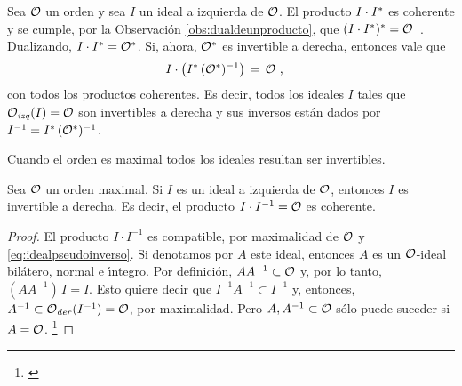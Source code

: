 \begin{obsDiferenteInvertible}\label{obs:diferenteinvertible}
	Sea $\cal{O}$ un orden y sea $I$ un ideal a izquierda de $\cal{O}$.
	El producto $I\cdot \dual{I}$ es coherente y se cumple, por la
	Observaci\'{o}n \ref{obs:dualdeunproducto}, que
	\begin{math}
		\dual{(I\cdot\dual{I})} =\cal{O}
	\end{math}~.
	Dualizando, $I\cdot\dual{I}=\dual{\cal{O}}$. Si, ahora,
	$\dual{\cal{O}}$ es invertible a derecha, entonces vale que
	\begin{align*}
		I\cdot\big(\dual{I}\,(\dual{\cal{O}})^{-1}\big) & \,=\,\cal{O}
		\text{ ,}
	\end{align*}
	con todos los productos coherentes. Es decir, todos los ideales $I$
	tales que $\Oizq(I)=\cal{O}$ son invertibles a derecha y sus inversos
	est\'{a}n dados por $I^{-1}=\dual{I}\,(\dual{\cal{O}})^{-1}$.
\end{obsDiferenteInvertible}

Cuando el orden es maximal todos los ideales resultan ser invertibles.

\begin{propoOrdenMaximalIdealInvertible}%
	\label{propo:ordenmaximalidealinvertible}
	Sea $\cal{O}$ un orden maximal. Si $I$ es un ideal a izquierda de
	$\cal{O}$, entonces $I$ es invertible a derecha. Es decir, el producto
	$I\cdot I^{-1}=\cal{O}$ es coherente.
\end{propoOrdenMaximalIdealInvertible}

\begin{proof}
	El producto $I\cdot I^{-1}$ es compatible, por maximalidad de $\cal{O}$
	y \ref{eq:idealpseudoinverso}. Si denotamos por $A$ este ideal,
	entonces $A$ es un $\cal{O}$-ideal bil\'{a}tero, normal e \'{\i}ntegro.
	Por definici\'{o}n, $AA^{-1}\subset\cal{O}$ y, por lo tanto,
	$(AA^{-1})\,I=I$. Esto quiere decir que $I^{-1}A^{-1}\subset I^{-1}$ y,
	entonces, $A^{-1}\subset\Oder(I^{-1})=\cal{O}$, por maximalidad. Pero
	$A,A^{-1}\subset\cal{O}$ s\'{o}lo puede suceder si $A=\cal{O}$.%
	\footnote{
		\cite[Satz~6, \S~2]{Deuring}
	}
\end{proof}

